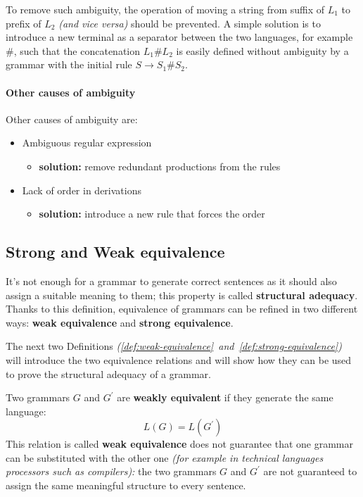 \documentclass[english]{article}
\begin{document}
To remove such ambiguity, the operation of moving a string from suffix of \(L_1\) to prefix of \(L_2\) \textit{(and vice versa)} should be prevented.
A simple solution is to introduce a new terminal as a separator between the two languages, for example \(\#\), such that the concatenation \(L_1 \# L_2\) is easily defined without ambiguity by a grammar with the initial rule \(S \rightarrow S_1 \# S_2\).

\paragraph{Other causes of ambiguity}
\label{par:other-causes-of-ambiguity}

Other causes of ambiguity are:

\begin{itemize}
  \item Ambiguous regular expression
        \begin{itemize}[label=\(\rightarrow\)]
          \item \textbf{solution:} remove redundant productions from the rules
        \end{itemize}
  \item Lack of order in derivations
        \begin{itemize}[label=\(\rightarrow\)]
          \item \textbf{solution:} introduce a new rule that forces the order
        \end{itemize}
\end{itemize}

\subsection{Strong and Weak equivalence}

It's not enough for a grammar to generate correct sentences as it should also assign a suitable meaning to them;
this property is called \textbf{structural adequacy}.
Thanks to this definition, equivalence of grammars can be refined in two different ways:
\textbf{weak equivalence} and \textbf{strong equivalence}.

The next two Definitions \textit{(\ref{def:weak-equivalence}~and~\ref{def:strong-equivalence})} will introduce the two equivalence relations and will show how they can be used to prove the structural adequacy of a grammar.

\begin{definition}
  \label{def:weak-equivalence}
  Two grammars \(G\) and \(G^\prime\) are \textbf{weakly equivalent} if they generate the same language:
  \[ L(G) = L(G^\prime) \]
  This relation is called \textbf{weak equivalence} does not guarantee that one grammar can be substituted with the other one \textit{(for example in technical languages processors such as compilers):}
  the two grammars \(G\) and \(G^\prime\) are not guaranteed to assign the same meaningful structure to every sentence.
\end{definition}
\end{document}
